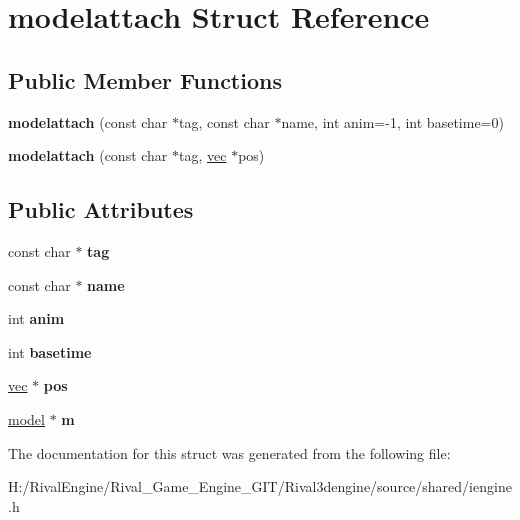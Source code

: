 \hypertarget{structmodelattach}{}\section{modelattach Struct Reference}
\label{structmodelattach}
\subsection*{Public Member Functions}
\begin{DoxyCompactItemize}
\item 
\mbox{\label{structmodelattach_a98e6c96afe3c7c2992d52774213b99fa}} 
{\bfseries modelattach} (const char $\ast$tag, const char $\ast$name, int anim=-\/1, int basetime=0)
\item 
\mbox{\label{structmodelattach_a2f4b050bf8a583b53e46e94622f8ec7e}} 
{\bfseries modelattach} (const char $\ast$tag, \hyperlink{structvec}{vec} $\ast$pos)
\end{DoxyCompactItemize}
\subsection*{Public Attributes}
\begin{DoxyCompactItemize}
\item 
\mbox{\label{structmodelattach_ab573e758ae4b8ed836179089906d25cb}} 
const char $\ast$ {\bfseries tag}
\item 
\mbox{\label{structmodelattach_a1087862f45c8fd1dbde379190e27b468}} 
const char $\ast$ {\bfseries name}
\item 
\mbox{\label{structmodelattach_a1a94630610603f08827171e40d8861d8}} 
int {\bfseries anim}
\item 
\mbox{\label{structmodelattach_ac9f330b24b9b4c11b3bd1a0be44907f0}} 
int {\bfseries basetime}
\item 
\mbox{\label{structmodelattach_a5e9da3e338f4d0dd5ca47609852cac04}} 
\hyperlink{structvec}{vec} $\ast$ {\bfseries pos}
\item 
\mbox{\label{structmodelattach_a94a5044feab26a9f0e067c3dd9f78b09}} 
\hyperlink{structmodel}{model} $\ast$ {\bfseries m}
\end{DoxyCompactItemize}


The documentation for this struct was generated from the following file\+:\begin{DoxyCompactItemize}
\item 
H\+:/\+Rival\+Engine/\+Rival\+\_\+\+Game\+\_\+\+Engine\+\_\+\+G\+I\+T/\+Rival3dengine/source/shared/iengine.\+h\end{DoxyCompactItemize}
